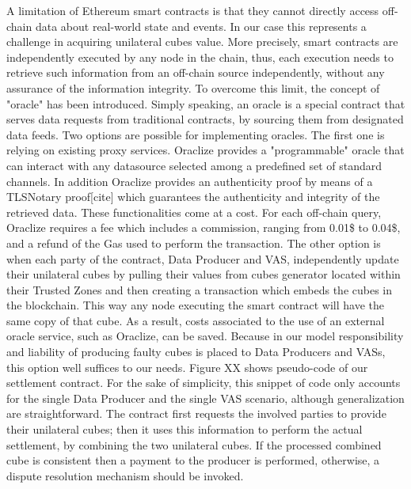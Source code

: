 \documentclass[chi_draft]{sigchi}
\begin{document}
A limitation of Ethereum smart contracts is that they cannot directly access off-chain data about real-world state and events. In our case this represents a challenge in acquiring unilateral cubes value. More precisely, smart contracts are independently executed by any node in the chain, thus, each execution needs to retrieve such information from an off-chain source independently, without any assurance of the information integrity.
To overcome this limit, the concept of "oracle" has been introduced. Simply speaking, an oracle is a special contract that serves data requests from traditional contracts, by sourcing them from designated data feeds. 
Two options are possible for implementing oracles. The first one is relying on existing proxy services. Oraclize provides a "programmable" oracle that can interact with any datasource selected among a predefined set of standard channels. In addition Oraclize provides an authenticity proof by means of a TLSNotary proof[cite] which guarantees the authenticity and integrity of the retrieved data. These functionalities come at a cost. For each off-chain query, Oraclize requires a fee which includes a commission, ranging from 0.01\$ to 0.04\$, and a refund of the Gas used to perform the transaction. 
The other option is when each party of the contract, Data Producer and VAS, independently update their unilateral cubes by pulling their values from cubes generator located within their Trusted Zones and then creating a transaction which embeds the cubes in the blockchain. This way any node executing the smart contract will have the same copy of that cube. As a result, costs associated to the use of an external oracle service, such as Oraclize, can be saved. Because in our model responsibility and liability of producing faulty cubes is placed to Data Producers and VASs, this option well suffices to our needs.
Figure XX shows pseudo-code of our settlement contract. For the sake of simplicity, this snippet of code only accounts for the single Data Producer and the single VAS scenario, although generalization are straightforward.
The contract first requests the involved parties to provide their unilateral cubes; then it uses this information to perform the actual settlement, by combining the two unilateral cubes. If the processed combined cube is consistent then a payment to the producer is performed, otherwise, a dispute resolution mechanism should be invoked.
\end{document}
